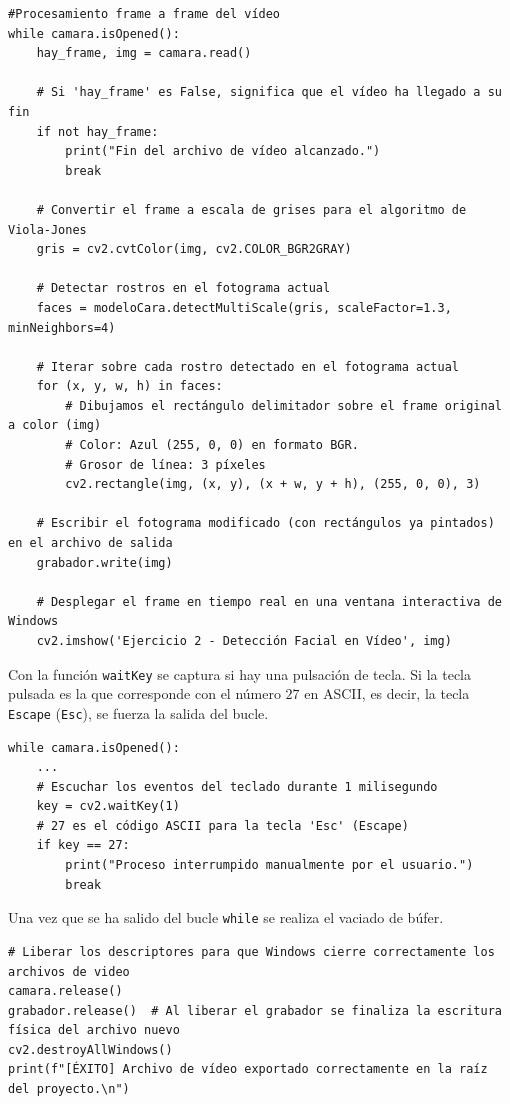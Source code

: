 \begin{lstlisting}[style=pythonstyle, caption={Frame a frame en ejercicio2}, label={lst:logica2}]
#Procesamiento frame a frame del vídeo
while camara.isOpened():
    hay_frame, img = camara.read()

    # Si 'hay_frame' es False, significa que el vídeo ha llegado a su fin
    if not hay_frame:
        print("Fin del archivo de vídeo alcanzado.")
        break

    # Convertir el frame a escala de grises para el algoritmo de Viola-Jones
    gris = cv2.cvtColor(img, cv2.COLOR_BGR2GRAY)

    # Detectar rostros en el fotograma actual
    faces = modeloCara.detectMultiScale(gris, scaleFactor=1.3, minNeighbors=4)

    # Iterar sobre cada rostro detectado en el fotograma actual
    for (x, y, w, h) in faces:
        # Dibujamos el rectángulo delimitador sobre el frame original a color (img)
        # Color: Azul (255, 0, 0) en formato BGR. 
        # Grosor de línea: 3 píxeles
        cv2.rectangle(img, (x, y), (x + w, y + h), (255, 0, 0), 3)

    # Escribir el fotograma modificado (con rectángulos ya pintados) en el archivo de salida
    grabador.write(img)

    # Desplegar el frame en tiempo real en una ventana interactiva de Windows
    cv2.imshow('Ejercicio 2 - Detección Facial en Vídeo', img)
\end{lstlisting}

Con la función \texttt{waitKey} se captura si hay una pulsación de tecla. Si la tecla pulsada es la que corresponde con el número $27$ en ASCII, es decir, la tecla \texttt{Escape} (\texttt{Esc}), se fuerza la salida del bucle.
\begin{lstlisting}[style=pythonstyle, caption={Cerrar ventana}, label={lst:cierre2}]
while camara.isOpened():
    ...
    # Escuchar los eventos del teclado durante 1 milisegundo
    key = cv2.waitKey(1)
    # 27 es el código ASCII para la tecla 'Esc' (Escape)
    if key == 27:
        print("Proceso interrumpido manualmente por el usuario.")
        break
\end{lstlisting}

Una vez que se ha salido del bucle \texttt{while} se realiza el vaciado de búfer. 
\begin{lstlisting}[style=pythonstyle, caption={Limpmieza del búfer}, label={lst:bufer2}]
# Liberar los descriptores para que Windows cierre correctamente los archivos de video
camara.release()
grabador.release()  # Al liberar el grabador se finaliza la escritura física del archivo nuevo
cv2.destroyAllWindows()
print(f"[ÉXITO] Archivo de vídeo exportado correctamente en la raíz del proyecto.\n")
\end{lstlisting}

